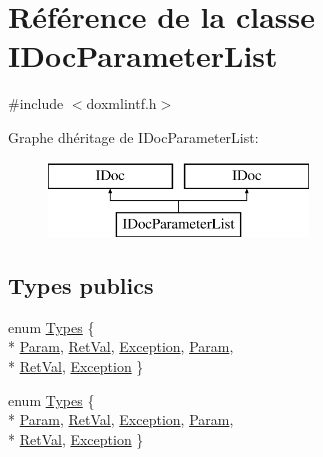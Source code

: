 \hypertarget{class_i_doc_parameter_list}{}\section{Référence de la classe I\+Doc\+Parameter\+List}
\label{class_i_doc_parameter_list}


{\ttfamily \#include $<$doxmlintf.\+h$>$}

Graphe d\textquotesingle{}héritage de I\+Doc\+Parameter\+List\+:\begin{figure}[H]
\begin{center}
\leavevmode
\includegraphics[height=2.000000cm]{class_i_doc_parameter_list}
\end{center}
\end{figure}
\subsection*{Types publics}
\begin{DoxyCompactItemize}
\item 
enum \hyperlink{class_i_doc_parameter_list_ad421a101c61e0e39266d2fde4ce5acc0}{Types} \{ \\*
\hyperlink{class_i_doc_parameter_list_ad421a101c61e0e39266d2fde4ce5acc0abe968daf6346329ee86a26f16632be68}{Param}, 
\hyperlink{class_i_doc_parameter_list_ad421a101c61e0e39266d2fde4ce5acc0a23a5e105d3354ede3d0a83730ad9fa66}{Ret\+Val}, 
\hyperlink{class_i_doc_parameter_list_ad421a101c61e0e39266d2fde4ce5acc0a6bd6de1c211cd09264b61086b631a020}{Exception}, 
\hyperlink{class_i_doc_parameter_list_ad421a101c61e0e39266d2fde4ce5acc0abe968daf6346329ee86a26f16632be68}{Param}, 
\\*
\hyperlink{class_i_doc_parameter_list_ad421a101c61e0e39266d2fde4ce5acc0a23a5e105d3354ede3d0a83730ad9fa66}{Ret\+Val}, 
\hyperlink{class_i_doc_parameter_list_ad421a101c61e0e39266d2fde4ce5acc0a6bd6de1c211cd09264b61086b631a020}{Exception}
 \}
\item 
enum \hyperlink{class_i_doc_parameter_list_ad421a101c61e0e39266d2fde4ce5acc0}{Types} \{ \\*
\hyperlink{class_i_doc_parameter_list_ad421a101c61e0e39266d2fde4ce5acc0abe968daf6346329ee86a26f16632be68}{Param}, 
\hyperlink{class_i_doc_parameter_list_ad421a101c61e0e39266d2fde4ce5acc0a23a5e105d3354ede3d0a83730ad9fa66}{Ret\+Val}, 
\hyperlink{class_i_doc_parameter_list_ad421a101c61e0e39266d2fde4ce5acc0a6bd6de1c211cd09264b61086b631a020}{Exception}, 
\hyperlink{class_i_doc_parameter_list_ad421a101c61e0e39266d2fde4ce5acc0abe968daf6346329ee86a26f16632be68}{Param}, 
\\*
\hyperlink{class_i_doc_parameter_list_ad421a101c61e0e39266d2fde4ce5acc0a23a5e105d3354ede3d0a83730ad9fa66}{Ret\+Val}, 
\hyperlink{class_i_doc_parameter_list_ad421a101c61e0e39266d2fde4ce5acc0a6bd6de1c211cd09264b61086b631a020}{Exception}
 \}
\end{DoxyCompactItemize}
